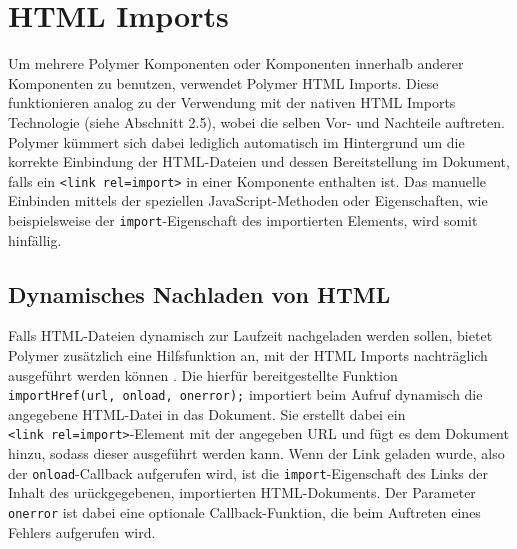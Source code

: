 \section{HTML Imports}\label{html-imports}

Um mehrere Polymer Komponenten oder Komponenten innerhalb anderer Komponenten zu benutzen, verwendet Polymer HTML Imports. Diese funktionieren analog zu der Verwendung mit der nativen HTML Imports Technologie (siehe Abschnitt 2.5), wobei die selben Vor- und Nachteile auftreten. Polymer kümmert sich dabei lediglich automatisch im Hintergrund um die korrekte Einbindung der HTML-Dateien und dessen Bereitstellung im Dokument, falls ein \texttt{\textless{}link\ rel=\dq import\dq\textgreater{}} in einer Komponente enthalten ist. Das manuelle Einbinden mittels der speziellen JavaScript-Methoden oder Eigenschaften, wie beispielsweise der \texttt{import}-Eigenschaft des importierten Elements, wird somit hinfällig.

\subsection{Dynamisches Nachladen von HTML}\label{dynamisches-nachladen-von-html}

Falls HTML-Dateien dynamisch zur Laufzeit nachgeladen werden sollen, bietet Polymer zusätzlich eine Hilfsfunktion an, mit der HTML Imports nachträglich ausgeführt werden können \cite{citeulike:13914840}. Die hierfür bereitgestellte Funktion \texttt{importHref(url,\ onload,\ onerror);} importiert beim Aufruf dynamisch die angegebene HTML-Datei in das Dokument. Sie erstellt dabei ein \texttt{\textless{}link\ rel=\dq import\dq\textgreater{}}-Element mit der angegeben URL und fügt es dem Dokument hinzu, sodass dieser ausgeführt werden kann. Wenn der Link geladen wurde, also der \texttt{onload}-Callback aufgerufen wird, ist die \texttt{import}-Eigenschaft des Links der Inhalt des  urückgegebenen, importierten HTML-Dokuments. Der Parameter \texttt{onerror} ist dabei eine optionale Callback-Funktion, die beim Auftreten eines Fehlers aufgerufen wird.
